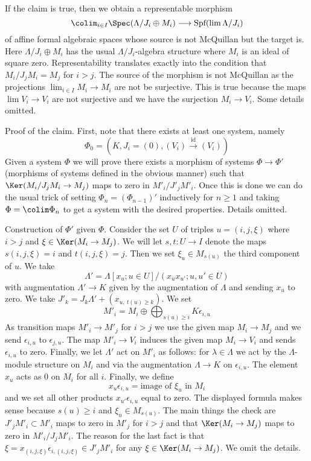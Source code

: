 \medskip\noindent
If the claim is true, then we obtain a representable morphism
$$
\colim_{i \in I} \Spec(\Lambda/J_i \oplus M_i)
\longrightarrow
\text{Spf}(\lim \Lambda/J_i)
$$
of affine formal algebraic spaces whose source is not McQuillan
but the target is. Here $\Lambda/J_i \oplus M_i$ has the usual
$\Lambda/J_i$-algebra structure where $M_i$ is an ideal of square zero.
Representability translates exactly into the
condition that $M_i/J_jM_i = M_j$ for $i > j$. The source
of the morphism is not McQuillan as the projections
$\lim_{i \in I} M_i \to M_i$ are not be surjective. This is true
because the maps $\lim V_i \to V_i$ are not surjective
and we have the surjection $M_i \to V_i$. Some details omitted.

\medskip\noindent
Proof of the claim. First, note that there exists at least one
system, namely
$$
\Phi_0 = (K, J_i = (0), (V_i) \xrightarrow{\text{id}} (V_i))
$$
Given a system $\Phi$ we will prove there exists a morphism of systems
$\Phi \to \Phi'$ (morphisms of systems defined in the obvious manner)
such that $\Ker(M_i/J_j M_i \to M_j)$ maps to zero in
$M'_i/J'_j M'_i$. Once this is done we can do the usual trick
of setting $\Phi_n = (\Phi_{n - 1})'$ inductively for $n \geq 1$ and
taking $\Phi = \colim \Phi_n$ to get a system with the desired properties.
Details omitted.

\medskip\noindent
Construction of $\Phi'$ given $\Phi$. Consider the set $U$ of
triples $u = (i, j, \xi)$ where $i > j$ and $\xi \in \Ker(M_i \to M_j)$.
We will let $s, t : U \to I$ denote the maps $s(i, j, \xi) = i$
and $t(i, j, \xi) = j$. Then we set $\xi_u \in M_{s(u)}$ the third
component of $u$. We take
$$
\Lambda' = \Lambda[x_u; u \in U]/(x_u x_{u'}; u, u' \in U)
$$
with augmentation $\Lambda' \to K$ given by the augmentation of $\Lambda$
and sending $x_u$ to zero.
We take $J'_k = J_k \Lambda' + (x_{u,\ t(u) \geq k})$.
We set
$$
M'_i = M_i \oplus \bigoplus\nolimits_{s(u) \geq i} K\epsilon_{i, u}
$$
As transition maps $M'_i \to M'_j$ for $i > j$ we use
the given map $M_i \to M_j$ and we send $\epsilon_{i, u}$ to
$\epsilon_{j, u}$. The map $M'_i \to V_i$ induces the given map
$M_i \to V_i$ and sends $\epsilon_{i, u}$ to zero.
Finally, we let $\Lambda'$ act on $M'_i$ as follows:
for $\lambda \in \Lambda$ we act by the $\Lambda$-module
structure on $M_i$ and via the augmentation $\Lambda \to K$
on $\epsilon_{i, u}$. The element $x_u$ acts as $0$ on $M_i$
for all $i$. Finally, we define
$$
x_u \epsilon_{i, u} = \text{image of }\xi_u\text{ in }M_i
$$
and we set all other products $x_{u'} \epsilon_{i, u}$ equal to zero.
The displayed formula makes sense because $s(u) \geq i$ and
$\xi_u \in M_{s(u)}$. The main things the check are $J'_j M'_i \subset M'_i$
maps to zero in $M'_j$ for $i > j$ and that $\Ker(M_i \to M_j)$
maps to zero in $M'_i/J_j M'_i$. The reason for the last fact
is that $\xi = x_{(i, j, \xi)} \epsilon_{i, (i, j, \xi)} \in J'_j M'_i$
for any $\xi \in \Ker(M_i \to M_j)$.
We omit the details.

